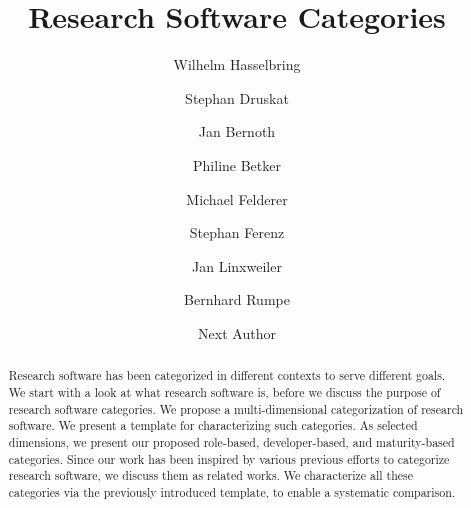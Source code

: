 \documentclass{IEEEcsmag}
\begin{document}

\title{Research Software Categories}

\author{Wilhelm Hasselbring}

\author{Stephan Druskat}


\author{Jan Bernoth}

\author{Philine Betker}

\author{Michael Felderer}

\author{Stephan Ferenz}

\author{Jan Linxweiler}

\author{Bernhard Rumpe}

\author{Next Author}


\begin{abstract}
Research software has been categorized in different contexts to serve different goals.
We start with a look at what research software is, before we discuss the purpose of research software categories. We propose a multi-dimensional categorization of research software. We present a template for characterizing such categories. As selected dimensions, we present our proposed role-based, developer-based, and maturity-based categories. Since our work has been inspired by various previous efforts to categorize research software, we discuss them as related works. We characterize all these categories via the previously introduced template, to enable a systematic comparison.
\end{abstract}

\maketitle
\end{document}
